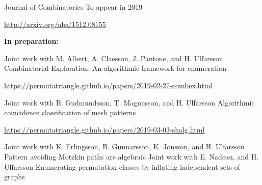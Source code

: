 \begin{cventries}
    {Journal of Combinatorics} %
    {To appear in 2019} %
    {
      \begin{cvitems} %
        \item \url{http://arxiv.org/abs/1512.08155}
      \end{cvitems}
    }%
\begin{flushleft}
  \textbf{In preparation:}
\end{flushleft}
\cventry
{Joint work with M. Albert, A. Claesson, J. Pantone, and H. Ulfarsson} %
{Combinatorial Exploration: An algorithmic framework for enumeration} %
{} %
{} %
{
  \begin{cvitems} %
    \item \url{https://permutatriangle.github.io/papers/2019-02-27-combex.html}
  \end{cvitems}
}%
\cventry
{Joint work with B. Gudmundsson, T. Magnusson, and H. Ulfarsson} %
{Algorithmic coincidence classification of mesh patterns} %
{} %
{} %
{
  \begin{cvitems} %
    \item \url{https://permutatriangle.github.io/papers/2019-03-03-shalg.html}
  \end{cvitems}
}%
\cventry
{Joint work with K. Erlingsson, B. Gunnarsson, K. Jonsson, and H. Ulfarsson} %
{Pattern avoiding Motzkin paths are algebraic} %
{} %
{} %
{
}%
\cventry
{Joint work with E. Nadeau, and H. Ulfarsson} %
{Enumerating permutation classes by inflating independent sets of graphs} %
{} %
{} %
{
}%
\end{cventries}

